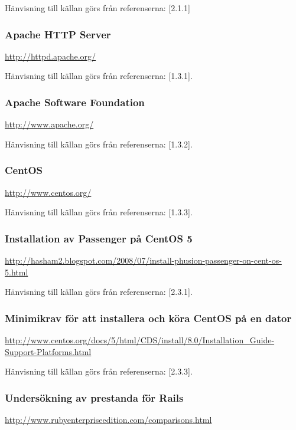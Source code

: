 \documentclass[a4paper, twoside, 11pt, titlepage]{article}
\begin{document}
		Hänvisning till källan görs från referenserna: [2.1.1]

		\subsubsection{Apache HTTP Server}


		\url{http://httpd.apache.org/}

		Hänvisning till källan görs från referenserna: [1.3.1].

		\subsubsection{Apache Software Foundation}


		\url{http://www.apache.org/}

		Hänvisning till källan görs från referenserna: [1.3.2].

		\subsubsection{CentOS}


		\url{http://www.centos.org/}

		Hänvisning till källan görs från referenserna: [1.3.3].

		\subsubsection{Installation av Passenger på CentOS 5}


		\url{http://hasham2.blogspot.com/2008/07/install-phusion-passenger-on-cent-os-5.html}

		Hänvisning till källan görs från referenserna: [2.3.1].

		\subsubsection{Minimikrav för att installera och köra CentOS på en dator}


		\url{http://www.centos.org/docs/5/html/CDS/install/8.0/Installation_Guide-Support-Platforms.html}

		Hänvisning till källan görs från referenserna: [2.3.3].

		\subsubsection{Undersökning av prestanda för Rails}


		\url{http://www.rubyenterpriseedition.com/comparisons.html}
\end{document}
